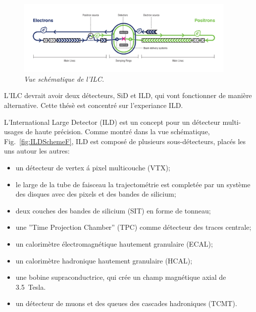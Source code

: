 \begin{figure}
	{\centering
		\includegraphics[width=0.95\textwidth]{graphics/ILC_scheme.jpg}
		\caption{\sl Vue sch\'ematique de l'ILC.}
		\label{fig:ILCSchemeF}
	}
\end{figure}

L’ILC devrait avoir deux d\'etecteurs, SiD et ILD, qui vont fonctionner de mani\`ere alternative.%
Cette th\'es\`e est concentr\'e sur l'experiance ILD. 

L'International Large Detector (ILD) est un concept pour un détecteur multi-usages de haute précision. %
Comme montr\'e dans la vue schématique, Fig.~\ref {fig:ILDSchemeF}, ILD est compos\'e de plusieurs sous-d\'etecteurs, plac\'es les uns autour les autres:
\begin{itemize}
	\item un d\'etecteur de vertex \'a pixel multicouche (VTX);
	\item le large de la tube de faisceau la trajectométrie est completée par un système des disques avec des pixels et des bandes de silicium;
	\item deux couches des bandes de silicium (SIT) en forme de tonneau;
	\item une ”Time Projection Chamber” (TPC) comme d\'etecteur des traces centrale;
	\item un calorim\`etre \'electromagn\'etique hautement granulaire (ECAL);
	\item un calorim\`etre hadronique hautement granulaire (HCAL);
	\item une bobine supraconductrice, qui cr\'ee un champ magn\'etique axial de 3.5~Tesla.
	\item un d\'etecteur de muons et des queues des cascades hadroniques (TCMT).
\end{itemize}

